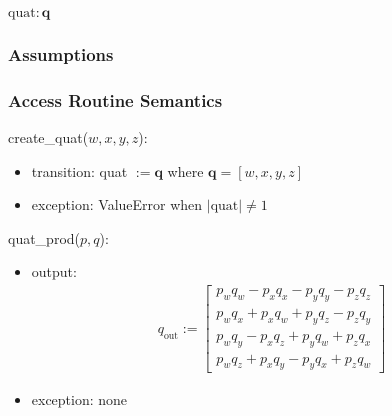 \documentclass[12pt, titlepage]{article}
\begin{document}
$\text{quat}: \mathbf{q}$




\subsubsection{Assumptions}


\subsubsection{Access Routine Semantics}

\noindent create\_quat($w, x, y, z$):
\begin{itemize}
\item transition: quat $:= \mathbf{q}$ where $\mathbf{q} = [w, x, y, z]$
\item exception: ValueError when  $|\text{quat}| \neq 1$
\end{itemize}

\noindent quat\_prod($p, q$):
\begin{itemize}
\item output:
  \begin{align*}
    q_\text{out} :=  \begin{bmatrix}
      p_w q_w - p_x q_x - p_y q_y - p_z q_z \\
      p_w q_x + p_x q_w + p_y q_z - p_z q_y \\
      p_w q_y - p_x q_z + p_y q_w + p_z q_x \\
      p_w q_z + p_x q_y - p_y q_x + p_z q_w
  \end{bmatrix}
  \end{align*}

\item exception: none
\end{itemize}
\end{document}
